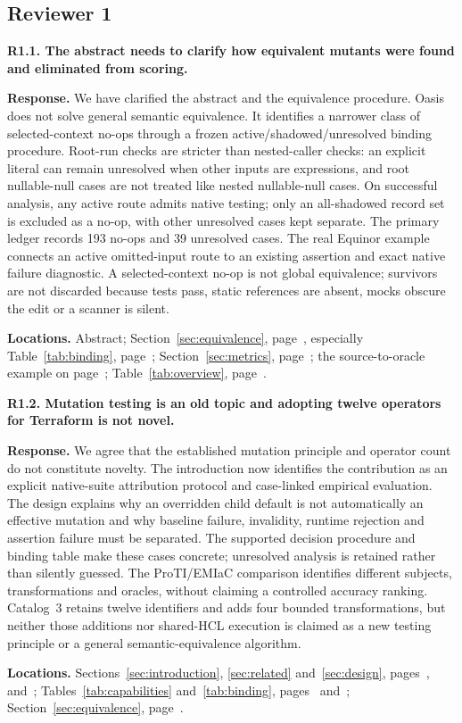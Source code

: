 \subsection*{Reviewer 1}

\noindent\textbf{R1.1. The abstract needs to clarify how equivalent mutants were found and eliminated from scoring.}\label{response:R1.1}\par
\textbf{Response.} We have clarified the abstract and the equivalence procedure. Oasis does not solve general semantic equivalence. It identifies a narrower class of selected-context no-ops through a frozen active/shadowed/unresolved binding procedure. Root-run checks are stricter than nested-caller checks: an explicit literal can remain unresolved when other inputs are expressions, and root nullable-null cases are not treated like nested nullable-null cases. On successful analysis, any active route admits native testing; only an all-shadowed record set is excluded as a no-op, with other unresolved cases kept separate. The primary ledger records 193 no-ops and 39 unresolved cases. The real Equinor example connects an active omitted-input route to an existing assertion and exact native failure diagnostic. A selected-context no-op is not global equivalence; survivors are not discarded because tests pass, static references are absent, mocks obscure the edit or a scanner is silent.\par
\textbf{Locations.} Abstract; Section~\ref{sec:equivalence}, page~\pageref{sec:equivalence}, especially Table~\ref{tab:binding}, page~\pageref{tab:binding}; Section~\ref{sec:metrics}, page~\pageref{sec:metrics}; the source-to-oracle example on page~\pageref{sec:workedexample}; Table~\ref{tab:overview}, page~\pageref{tab:overview}.

\medskip
\noindent\textbf{R1.2. Mutation testing is an old topic and adopting twelve operators for Terraform is not novel.}\label{response:R1.2}\par
\textbf{Response.} We agree that the established mutation principle and operator count do not constitute novelty. The introduction now identifies the contribution as an explicit native-suite attribution protocol and case-linked empirical evaluation. The design explains why an overridden child default is not automatically an effective mutation and why baseline failure, invalidity, runtime rejection and assertion failure must be separated. The supported decision procedure and binding table make these cases concrete; unresolved analysis is retained rather than silently guessed. The ProTI/EMIaC comparison identifies different subjects, transformations and oracles, without claiming a controlled accuracy ranking. Catalog~3 retains twelve identifiers and adds four bounded transformations, but neither those additions nor shared-HCL execution is claimed as a new testing principle or a general semantic-equivalence algorithm.\par
\textbf{Locations.} Sections~\ref{sec:introduction}, \ref{sec:related} and~\ref{sec:design}, pages~\pageref{sec:introduction}, \pageref{sec:related} and~\pageref{sec:design}; Tables~\ref{tab:capabilities} and~\ref{tab:binding}, pages~\pageref{tab:capabilities} and~\pageref{tab:binding}; Section~\ref{sec:equivalence}, page~\pageref{sec:equivalence}.

